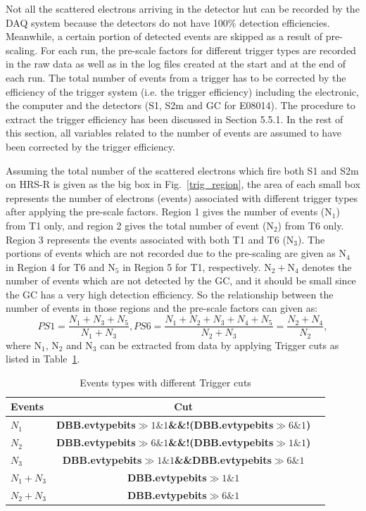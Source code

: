   Not all the scattered electrons arriving in the detector hut can be recorded by the DAQ system because the detectors do not have 100\% detection efficiencies. Meanwhile, a certain portion of detected events are skipped as a result of pre-scaling. For each run, the pre-scale factors for different trigger types are recorded in the raw data as well as in the log files created at the start and at the end of each run. The total number of events from a trigger has to be corrected by the efficiency of the trigger system (i.e. the trigger efficiency) including the electronic, the computer and the detectors (S1, S2m and GC for E08014). The procedure to extract the trigger efficiency has been discussed in Section 5.5.1. In the rest of this section, all variables related to the number of events are assumed to have been corrected by the trigger efficiency.
   
  Assuming the total number of the scattered electrons which fire both S1 and S2m on HRS-R is given as the big box in Fig.~\ref{trig_region}, the area of each small box represents the number of electrons (events) associated with different trigger types after applying the pre-scale factors. Region 1 gives the number of events ($\mathrm{N_{1}}$) from T1 only, and region 2 gives the total number of event ($\mathrm{N_{2}}$) from T6 only. Region 3 represents the events associated with both T1 and T6 ($\mathrm{N_{3}}$). The portions of events which are not recorded due to the pre-scaling are given as $\mathrm{N_{4}}$ in Region 4 for T6 and $\mathrm{N_{5}}$ in Region 5 for T1, respectively. $\mathrm{N_{2}+ N_{4}}$ denotes the number of events which are not detected by the GC, and it should be small since the GC has a very high detection efficiency. So the relationship between the number of events in those regions and the pre-scale factors can given as:
 \begin{equation}
 PS1 = \frac{N_{1}+N_{3}+N_{5}}{N_{1}+N_{3}},  PS6 = \frac{N_{1}+N_{2}+N_{3}+N_{4}+N_{5}}{N_{2}+N_{3}}=\frac{N_{2}+N_{4}}{N_{2}},
\end{equation}
 where $\mathrm{N_{1}}$, $\mathrm{N_{2}}$ and $\mathrm{N_{3}}$ can be extracted from data by applying Trigger cuts as listed in Table~\ref{trigger_cut_table}.
\begin{table}[htbp]
 \begin{tabular}{lcc}
\toprule
 Events  &  Cut\\
\midrule
$N_{1}$  &  \textbf{DBB.evtypebits$\gg1\&1$\&\&!(DBB.evtypebits$\gg6\&1$)} \\
$N_{2}$  &  \textbf{DBB.evtypebits$\gg6\&1$\&\&!(DBB.evtypebits$\gg1\&1$)} \\
$N_{3}$  &  \textbf{DBB.evtypebits$\gg1\&1$\&\&DBB.evtypebits$\gg6\&1$}  \\
$N_{1}+N_{3}$  &  \textbf{DBB.evtypebits$\gg1\&1$}  \\
$N_{2}+N_{3}$  &  \textbf{DBB.evtypebits$\gg6\&1$}  \\
\bottomrule
  \end{tabular}
  \caption[Events types with different Trigger cuts]{Events types with different Trigger cuts}
  \label{trigger_cut_table}
\end{table}

